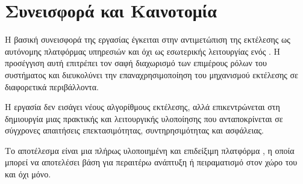 \section{Συνεισφορά και Καινοτομία}

Η βασική συνεισφορά της εργασίας έγκειται στην αντιμετώπιση της εκτέλεσης  ως αυτόνομης
πλατφόρμας υπηρεσιών και όχι ως εσωτερικής λειτουργίας ενός . Η προσέγγιση αυτή επιτρέπει τον
σαφή διαχωρισμό των επιμέρους ρόλων του συστήματος και διευκολύνει την επαναχρησιμοποίηση του
μηχανισμού εκτέλεσης σε διαφορετικά περιβάλλοντα.

Η εργασία δεν εισάγει νέους αλγορίθμους εκτέλεσης, αλλά επικεντρώνεται στη δημιουργία μιας πρακτικής και
λειτουργικής υλοποίησης που ανταποκρίνεται σε σύγχρονες απαιτήσεις επεκτασιμότητας, συντηρησιμότητας
και ασφάλειας.

Το αποτέλεσμα είναι μια πλήρως υλοποιημένη και επιδείξιμη πλατφόρμα , η οποία μπορεί να
αποτελέσει βάση για περαιτέρω ανάπτυξη ή πειραματισμό στον χώρο του  και όχι μόνο.